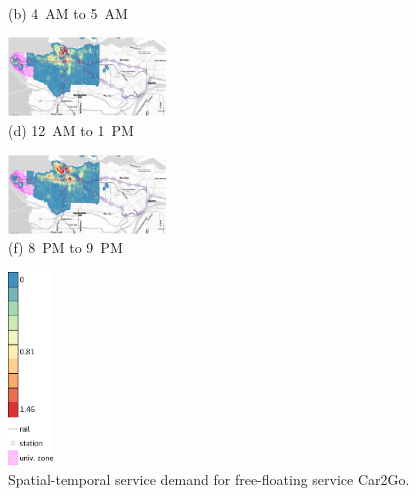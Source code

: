 \begin{figure}[hhh!!]
\begin{minipage}[b]{0.3\linewidth}
\begin{minipage}[b]{\linewidth}
           {\\(b) 4~AM to 5~AM}
         \end{minipage}
         \begin{minipage}[b]{\linewidth}
           \centering
           \hspace*{-0.1cm}
           \includegraphics[width=42mm]{car2go_heatmaps/min/12.pdf}
           {\\(d) 12~AM to 1~PM}
         \end{minipage}
         \begin{minipage}[b]{\linewidth}
           \hspace*{-0.1cm}
           \centering
           \includegraphics[width=42mm]{car2go_heatmaps/min/20.pdf}
           {\\(f) 8~PM to 9~PM}
         \end{minipage}
   \end{minipage}
   \begin{minipage}[b]{0.1\linewidth}
   \centering
   		 \hspace*{12mm}
   		 \includegraphics[width=12mm]{car2go_heatmaps/legenda_car2go.pdf}
         \vspace{17mm}
   \end{minipage}
   \caption{Spatial-temporal service demand for free-floating service Car2Go.}
   \label{fig:heat_car2go}
\end{figure}

